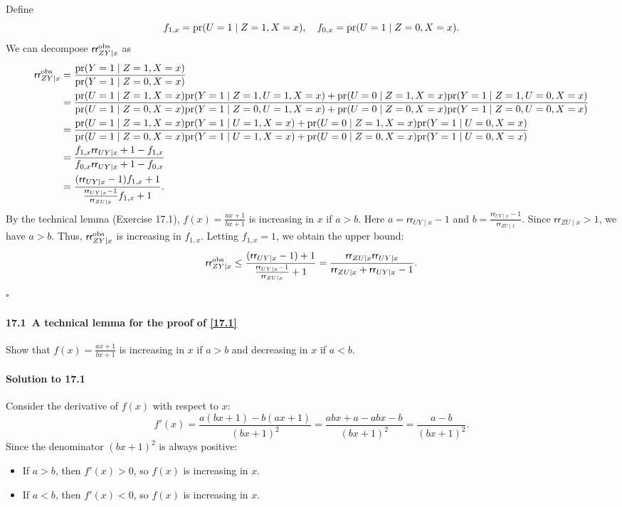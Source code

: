 \documentclass[krantz1]{krantz}
\newenvironment{myproof}[2] {\noindent {\bfseries Proof of {#1} {#2}:}}{\hfill$\square$}
\def\pr{\textup{pr}}
\def\RR{\textsf{rr}}
\def\obs{\textup{obs}}
\def\Paragraph{\paragraph}
\begin{document}
\begin{myproof}{Theorem}{\ref{17.1}}
Define 
$$ 
f_{1,x} = \pr(U=1\mid Z=1,X=x),\quad
f_{0,x}  = \pr(U=1\mid Z=0,X=x) .
$$ 
We can decompose $\RR_{ZY\mid x}^\obs$ as
\begin{align*}
\RR_{ZY\mid x}^\obs  
&= \frac{  \pr( Y  = 1\mid Z=1, X=x  ) }{ \pr( Y  = 1\mid  Z=0,  X=x  ) } \\
&= \frac{ \pr(U=1\mid Z=1,  X=x) \pr( Y  = 1\mid Z=1, U=1,  X=x  ) + \pr(U=0\mid Z=1,  X=x) \pr( Y  = 1\mid Z=1, U=0,  X=x  ) }
{  \pr(U=1\mid Z=0,  X=x) \pr( Y  = 1\mid  Z=0, U=1,  X=x  )  +  \pr(U=0\mid Z=0,  X=x) \pr( Y  = 1\mid  Z=0, U=0,  X=x  )   } \\
&= \frac{ \pr(U=1\mid Z=1,  X=x) \pr( Y  = 1\mid U=1,  X=x  ) + \pr(U=0\mid Z=1,  X=x) \pr( Y  = 1\mid U=0,  X=x  )  }
{   \pr(U=1\mid Z=0,  X=x) \pr( Y  = 1\mid   U=1,  X=x  )  +  \pr(U=0\mid Z=0,  X=x) \pr( Y  = 1\mid  U=0,  X=x  )   } \\
&= \frac{  f_{1,x} \RR_{UY\mid x} + 1- f_{1,x}  }{ f_{0,x} \RR_{UY\mid x} + 1- f_{0,x}  } \\
&= \frac{  (\RR_{UY\mid x} - 1) f_{1,x} + 1  }{      \frac{  \RR_{UY\mid x} - 1}{  \RR_{ZU\mid x} }    f_{1,x} + 1  } .
\end{align*}
By the technical lemma (Exercise 17.1), $f(x) = \frac{ax+1}{bx+1}$ is increasing in $x$ if $a > b$. Here $a = \RR_{UY\mid x} - 1$ and $b = \frac{\RR_{UY\mid x} - 1}{\RR_{ZU\mid x}}$. Since $\RR_{ZU\mid x} > 1$, we have $a > b$. Thus, $\RR_{ZY\mid x}^\obs$ is increasing in $f_{1,x}$. Letting $f_{1,x} = 1$, we obtain the upper bound:
$$
\RR_{ZY\mid x}^\obs \leq \frac{  (\RR_{UY\mid x} - 1) + 1  }{      \frac{  \RR_{UY\mid x} - 1}{  \RR_{ZU\mid x} }    + 1  }
= \frac{ \RR_{ZU\mid x}  \RR_{UY\mid x} }{  \RR_{ZU\mid x} + \RR_{UY\mid x} - 1} .
$$
\end{myproof}

 \Paragraph{17.1~A technical lemma for the proof of \cref{17.1}}\label{hw::technical-lemma}

Show that $f(x) = \frac{ax+1}{bx+1}$ is increasing in $x$ if $a > b$ and decreasing in $x$ if $a < b$.

\Paragraph{Solution to 17.1}

Consider the derivative of $f(x)$ with respect to $x$:
\begin{equation*}
    f'(x) = \frac{a(bx+1) - b(ax+1)}{(bx+1)^2} = \frac{abx + a - abx - b}{(bx+1)^2} = \frac{a - b}{(bx+1)^2}.
\end{equation*}
Since the denominator $(bx+1)^2$ is always positive:
\begin{itemize}
    \item If $a > b$, then $f'(x) > 0$, so $f(x)$ is increasing in $x$.
    \item If $a < b$, then $f'(x) < 0$, so $f(x)$ is increasing in $x$.
\end{itemize}
\end{document}
